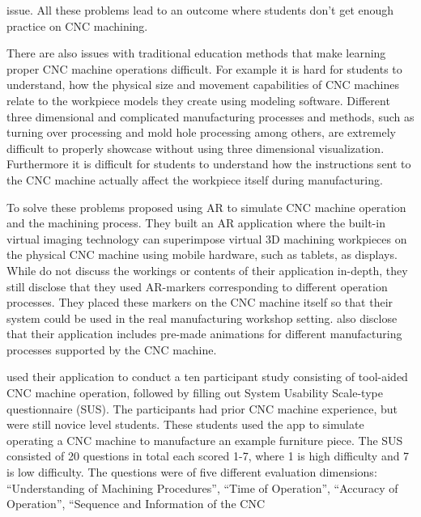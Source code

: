 issue.\cite{LinAndLee2020} All these problems lead to an outcome where 
students don't get enough practice on CNC machining.\cite{LinAndLee2020}\par
	There are also issues with traditional education methods that make 
learning proper CNC machine operations difficult. For example it is hard for 
students to understand, how the physical size and movement capabilities of 
CNC machines relate to the workpiece models they create using modeling 
software.\cite{LinAndLee2020} Different three dimensional and complicated 
manufacturing processes and methods, such as turning over processing and mold 
hole processing among others, are extremely difficult to properly showcase 
without using three dimensional visualization.\cite{LinAndLee2020} 
Furthermore it is difficult for students to understand how the instructions 
sent to the CNC machine actually affect the workpiece itself during 
manufacturing.\cite{LinAndLee2020}\par
	To solve these problems \textcite{LinAndLee2020} proposed using AR to 
simulate CNC machine operation and the machining process.\cite{LinAndLee2020} 
They built an AR application where the built-in virtual imaging technology 
can superimpose virtual 3D machining workpieces on the physical CNC machine 
using mobile hardware, such as tablets, as displays.\cite{LinAndLee2020} 
While \textcite{LinAndLee2020} do not discuss the workings or contents of 
their application in-depth, they still disclose that they used AR-markers 
corresponding to different operation processes. They placed these markers on 
the CNC machine itself so that their system could be used in the real 
manufacturing workshop setting.\cite{LinAndLee2020} \textcite{LinAndLee2020} 
also disclose that their application includes pre-made animations for 
different manufacturing processes supported by the CNC machine.\par
	\textcite{LinAndLee2020} used their application to conduct a ten 
participant study consisting of tool-aided CNC machine operation, followed by 
filling out System Usability Scale-type questionnaire (SUS). The participants 
had prior CNC machine experience, but were still novice level 
students.\cite{LinAndLee2020} These students used the app to simulate 
operating a CNC machine to manufacture an example furniture piece. The SUS 
consisted of 20 questions in total each scored 1-7, where 1 is high 
difficulty and 7 is low difficulty. The questions were of five different 
evaluation dimensions: “Understanding of Machining Procedures”, “Time of 
Operation”, “Accuracy of Operation”, “Sequence and Information of the CNC 
